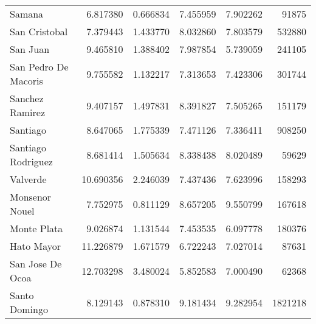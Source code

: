 \begin{tabular}{lrrrrr}
                 Samana &   6.817380 &  0.666834 &   7.455959 &   7.902262 &    91875 \\
          San Cristobal &   7.379443 &  1.433770 &   8.032860 &   7.803579 &   532880 \\
               San Juan &   9.465810 &  1.388402 &   7.987854 &   5.739059 &   241105 \\
   San Pedro De Macoris &   9.755582 &  1.132217 &   7.313653 &   7.423306 &   301744 \\
        Sanchez Ramirez &   9.407157 &  1.497831 &   8.391827 &   7.505265 &   151179 \\
               Santiago &   8.647065 &  1.775339 &   7.471126 &   7.336411 &   908250 \\
     Santiago Rodriguez &   8.681414 &  1.505634 &   8.338438 &   8.020489 &    59629 \\
               Valverde &  10.690356 &  2.246039 &   7.437436 &   7.623996 &   158293 \\
         Monsenor Nouel &   7.752975 &  0.811129 &   8.657205 &   9.550799 &   167618 \\
            Monte Plata &   9.026874 &  1.131544 &   7.453535 &   6.097778 &   180376 \\
             Hato Mayor &  11.226879 &  1.671579 &   6.722243 &   7.027014 &    87631 \\
       San Jose De Ocoa &  12.703298 &  3.480024 &   5.852583 &   7.000490 &    62368 \\
          Santo Domingo &   8.129143 &  0.878310 &   9.181434 &   9.282954 &  1821218 \\
\bottomrule
\end{tabular}
